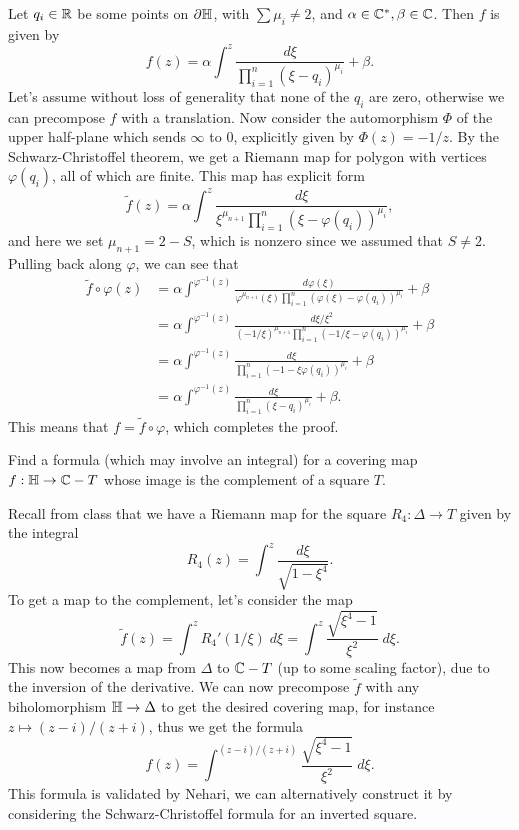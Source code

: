 \documentclass{pset}
\begin{document}
\begin{solution}
  Let $q_i\in \mathbb{R}$ be some points on $\partial \mathbb{H}$, with $\sum \mu_i \neq 2$, and $\alpha\in \mathbb{C}^*, \beta\in \mathbb{C}$. Then $f$ is given by 
  \[
    f(z) = \alpha \int^z \frac{d\xi}{\prod^n_{i=1}(\xi-q_i)^{\mu_i}}+ \beta.
  \]
  Let's assume without loss of generality that none of the $q_i$ are zero, otherwise we can precompose $f$ with a translation. Now consider the automorphism $\Phi$ of the upper half-plane which sends $\infty$ to $0$, explicitly given by $\Phi(z)=-1/z$. By the Schwarz-Christoffel theorem, we get a Riemann map for polygon with vertices $\varphi(q_i)$, all of which are finite. This map has explicit form
  \[
    \widetilde{f}(z) = \alpha\int^z \frac{d\xi}{\xi^{\mu_{n+1}}\prod^{n}_{i=1}(\xi-\varphi(q_i))^{\mu_i}},
  \]
  and here we set $\mu_{n+1} = 2-S$, which is nonzero since we assumed that $S\neq 2$. Pulling back along $\varphi$, we can see that
  \[
    \begin{aligned}
      \widetilde{f}\circ \varphi(z) &= \alpha\int^{\varphi^{-1}(z)} \frac{d\varphi(\xi)}{\varphi^{\mu_{n+1}}(\xi) \prod^n_{i=1}(\varphi(\xi)-\varphi(q_i))^{\mu_i}}+\beta\\
                       &= \alpha\int^{\varphi^{-1}(z)} \frac{d\xi / \xi^2}{{(-1/\xi)^{\mu_{n+1}} \prod^n_{i=1}(-1/\xi-\varphi(q_i))^{\mu_i}}}+\beta\\
                       &= \alpha\int^{\varphi^{-1}(z)} \frac{d\xi}{{\prod^n_{i=1}(-1-\xi\varphi(q_i))^{\mu_i}}}+\beta\\
                       &= \alpha\int^{\varphi^{-1}(z)}\frac{d\xi}{\prod^n_{i=1}(\xi - q_i)^{\mu_i}}+\beta.
    \end{aligned}
  \]
  This means that $f=\widetilde{f}\circ \varphi$, which completes the proof.
\end{solution}

\begin{problem}{4.31}
  Find a formula (which may involve an integral) for a covering map $f : \mathbb{H} \to \mathbb{C} - T$ whose image is the complement of a square $T$.
\end{problem}

\begin{solution}
  Recall from class that we have a Riemann map for the square $R_4 : \Delta \to T$ given by the integral
  \[
    R_4(z)  = \int^z \frac{d\xi}{\sqrt{1-\xi^4}}.
  \]
  To get a map to the complement, let's consider the map
  \[
    \widetilde{f}(z) = \int^z R_4'(1/\xi)\;d\xi = \int^z \frac{\sqrt{\xi^4-1 }}{\xi^2}\;d\xi.
  \]
  This now becomes a map from $\Delta$ to $\mathbb{C} - T$ (up to some scaling factor), due to the inversion of the derivative. We can now precompose $\widetilde{f}$ with any biholomorphism $\mathbb{H} \to \Delta$ to get the desired covering map, for instance $z\mapsto (z-i)/(z+i)$, thus we get the formula
  \[
    f(z) = \int^{(z-i)/(z+i)} \frac{\sqrt{\xi^4-1}}{\xi^2}\;d\xi.
  \]
  This formula is validated by Nehari, we can alternatively construct it by considering the Schwarz-Christoffel formula for an inverted square.
\end{solution}
\end{document}
